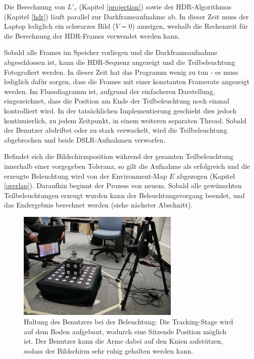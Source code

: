    Die Berechnung von $L'_r$ (Kapitel \ref{projection}) sowie der HDR-Algorithmus (Kapitel \ref{hdr}) läuft parallel zur Darkframeaufnahme ab.
   In dieser Zeit muss der Laptop lediglich ein schwarzes Bild ($V=0$) anzeigen, weshalb die Rechenzeit für die Berechnung der HDR-Frames verwendet werden kann.
 

   Sobald alle Frames im Speicher vorliegen und die Darkframeaufnahme abgeschlossen ist, kann die HDR-Sequenz angezeigt und die Teilbeleuchtung Fotografiert werden.
   In dieser Zeit hat das Programm wenig zu tun - es muss lediglich dafür sorgen, dass die Frames mit einer konstanten Framerate angezeigt werden.
   Im Flussdiagramm ist, aufgrund der einfacheren Darstellung, eingezeichnet, dass die Position am Ende der Teilbeleuchtung noch einmal kontrolliert wird. 
   In der tatsächlichen Implementierung geschieht dies jedoch kontinuierlich, zu jedem Zeitpunkt, in einem weiteren separaten Thread.
   Sobald der Benutzer  abdriftet oder zu stark verwackelt, wird die Teilbeleuchtung abgebrochen und beide DSLR-Aufnahmen verworfen.
   
   Befindet sich die Bildschirmposition während der gesamten Teilbeleuchtung innerhalb einer vorgegeben Toleranz, so 
   gilt die Aufnahme als erfolgreich und die erzeugte Beleuchtung wird von der Environment-Map $E$ abgezogen (Kapitel \ref{overlap}).
   Daraufhin beginnt der Prozess von neuem.
   Sobald alle gewünschten Teilbeleuchtungen erzeugt wurden kann der Beleuchtungsvorgang beendet, und das Endergebnis berechnet werden (siehe nächster Abschnitt). 
 
    \begin{figure}[h]
    \centering
     \includegraphics[width=0.70\textwidth]{../graphics/beleuchtung/procedure_day_small.jpg} 
    \caption[Haltung des Benutzers bei der Beleuchtung]{ Haltung des Benutzers bei der Beleuchtung: Die Tracking-Stage wird auf dem Boden aufgebaut, wodurch eine Sitzende Position möglich ist. Der Benutzer kann die Arme dabei auf den Knien aufstützen, sodass der Bildschirm sehr ruhig gehalten werden kann. }
    \label{fig:ablauf_position}
   \end{figure}


